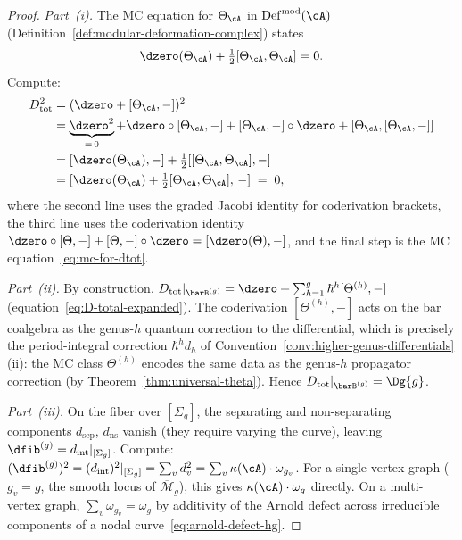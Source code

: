 \begin{proof}
\emph{Part~(i).}
The MC equation for $\Theta_\cA$ in
$\operatorname{Def}^{\mathrm{mod}}(\cA)$
(Definition~\ref{def:modular-deformation-complex}) states
\begin{equation}\label{eq:mc-for-dtot}
\dzero(\Theta_\cA) + \tfrac{1}{2}[\Theta_\cA, \Theta_\cA] = 0.
\end{equation}
Compute:
\begin{align*}
D_{\mathrm{tot}}^2
&= (\dzero + [\Theta_\cA, -])^2 \\
&= \underbrace{\dzero^2}_{=\,0}
 + \dzero \circ [\Theta_\cA, -]
 + [\Theta_\cA, -] \circ \dzero
 + [\Theta_\cA, [\Theta_\cA, -]] \\
&= [\dzero(\Theta_\cA), -]
 + \tfrac{1}{2}[[\Theta_\cA, \Theta_\cA], -] \\
&= [\dzero(\Theta_\cA) + \tfrac{1}{2}[\Theta_\cA, \Theta_\cA],\, -]
\;=\; 0,
\end{align*}
where the second line uses the graded Jacobi identity for
coderivation brackets, the third line uses the coderivation identity
$\dzero \circ [\Theta, -] + [\Theta, -] \circ \dzero
= [\dzero(\Theta), -]$, and the final step is the
MC equation~\eqref{eq:mc-for-dtot}.

\emph{Part~(ii).}
By construction,
$D_{\mathrm{tot}}|_{\barB^{(g)}} = \dzero +
\sum_{h=1}^g \hbar^h [\Theta^{(h)}, -]$
(equation~\eqref{eq:D-total-expanded}).
The coderivation $[\Theta^{(h)}, -]$ acts on the bar coalgebra
as the genus-$h$ quantum correction to the differential,
which is precisely the period-integral correction $\hbar^h d_h$
of Convention~\ref{conv:higher-genus-differentials}(ii):
the MC class $\Theta^{(h)}$ encodes the same data as the
genus-$h$ propagator correction (by
Theorem~\ref{thm:universal-theta}).
Hence $D_{\mathrm{tot}}|_{\barB^{(g)}} = \Dg{g}$.

\emph{Part~(iii).}
On the fiber over $[\Sigma_g]$, the separating and non-separating
components $d_{\mathrm{sep}}$, $d_{\mathrm{ns}}$ vanish (they
require varying the curve), leaving
$\dfib^{(g)} = d_{\mathrm{int}}|_{[\Sigma_g]}$. Compute:
$(\dfib^{(g)})^2 = (d_{\mathrm{int}})^2|_{[\Sigma_g]}
= \sum_v d_v^2 = \sum_v \kappa(\cA) \cdot \omega_{g_v}$.
For a single-vertex graph ($g_v = g$, the smooth locus of
$\overline{\mathcal{M}}_g$), this gives $\kappa(\cA) \cdot
\omega_g$ directly.
On a multi-vertex graph, $\sum_v \omega_{g_v} = \omega_g$ by
additivity of the Arnold defect across irreducible components
of a nodal curve~\eqref{eq:arnold-defect-hg}.
\end{proof}

